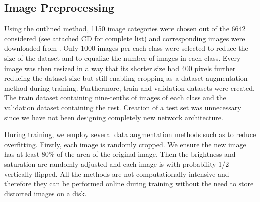 \subsection{Image Preprocessing}
Using the outlined method, 1150 image categories were chosen out of the 6642 considered (see attached CD for complete list) and corresponding images were downloaded from \cite{ImageNetDownload}. Only 1000 images per each class were selected to reduce the size of the dataset and to equalize the number of images in each class. Every image was then resized in a way that its shorter size had 400 pixels further reducing the dataset size but still enabling cropping as a dataset augmentation method during training. Furthermore, train and validation datasets were created. The train dataset containing nine-tenths of images of each class and the validation dataset containing the rest. Creation of a test set was unnecessary since we have not been designing completely new network architecture.

During training, we employ several data augmentation methods such as \cite{simard2003best} to reduce overfitting. Firstly, each image is randomly cropped. We ensure the new image has at least 80\% of the area of the original image. Then the brightness and saturation are randomly adjusted and each image is with probability 1/2 vertically flipped. All the methods are not computationally intensive and therefore they can be performed online during training without the need to store distorted images on a disk.


